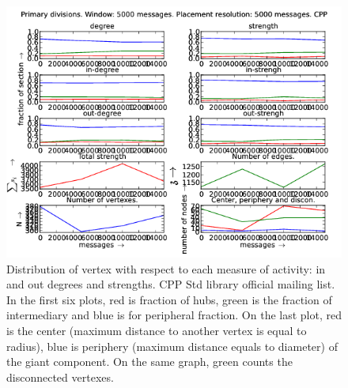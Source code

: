 \documentclass[%
 aip,
 jmp,%
 amsmath,amssymb,
 reprint,%
]{revtex4-1}
\begin{document}
\begin{figure}[hbtp] 
   \centering
        \includegraphics[width=\textwidth]{figs/CPP/5000}
    \caption{Distribution of vertex with respect to each measure of activity: in and out degrees and strengths. CPP Std library official mailing list. In the first six plots, red is fraction of hubs, green is the fraction of intermediary and blue is for peripheral fraction. On the last plot, red is the center (maximum distance to another vertex is equal to radius), blue is periphery (maximum distance equals to diameter) of the giant component. On the same graph, green counts the disconnected vertexes.}
    \label{fig:cpp5000}
\end{figure}
\end{document}
